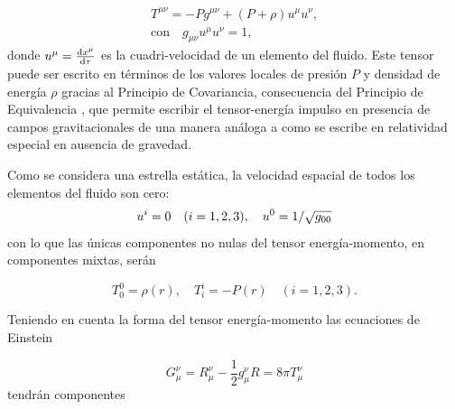 \begin{equation}
    \begin{array} { c } { T ^ { \mu \nu } = - P g ^ { \mu \nu } + ( P + \rho ) u ^ { \mu } u ^ { \nu } }, \\ \text{con} \quad { g _ { \mu \nu } u ^ { \mu } u ^ { \nu } = 1 }, \end{array}
\end{equation}
donde $u^{\mu}=\dv{x^{\mu}}{\tau}$ es la cuadri-velocidad de un elemento del fluido. Este tensor puede ser escrito en términos de los valores locales de presión $P$ y densidad de energía $\rho$ gracias al Principio de Covariancia, consecuencia del Principio de Equivalencia \cite{Weinberg1972}, que permite escribir el tensor-energía impulso en presencia de campos gravitacionales de una manera análoga a como se escribe en relatividad especial en ausencia de gravedad.

Como se considera una estrella estática, la velocidad espacial de todos los elementos del fluido son cero:
\begin{equation}
    u^{i}=0 \quad (i=1,2,3)\qc u ^ { 0 } = 1 / \sqrt { g _ { 00 } }
\end{equation}
con lo que las únicas componentes no nulas del tensor energía-momento, en componentes mixtas, serán

\begin{equation}
T _ { 0 } ^ { 0 } = \rho(r) , \quad T _ { i } ^ { i } = - P(r) \quad ( i=1,2,3 ).  
\end{equation}

Teniendo en cuenta la forma del tensor energía-momento las ecuaciones de Einstein

\begin{equation}
    G _ { \mu } ^ { \nu } = R _ { \mu } ^ { \nu } - \frac { 1 } { 2 } g _ { \mu } ^ { \nu } R = 8 \pi T _ { \mu } ^ { \nu }
\end{equation}
tendrán componentes     

